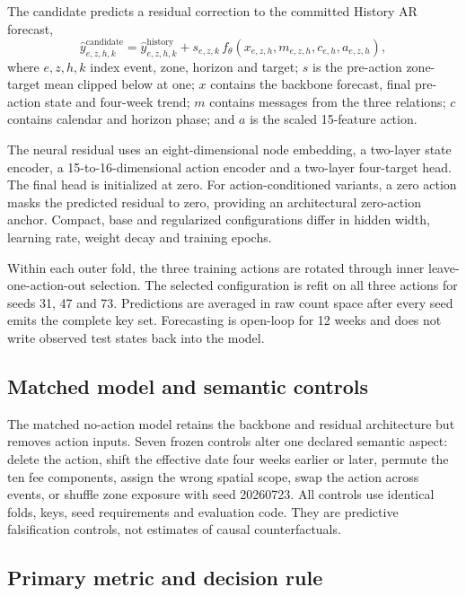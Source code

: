 \documentclass{nature}
\begin{document}
\begin{methods}
The candidate predicts a residual correction to the committed History AR forecast,
\begin{equation}
\widehat y^{\mathrm{candidate}}_{e,z,h,k}
=\widehat y^{\mathrm{history}}_{e,z,h,k}
+s_{e,z,k}\,f_{\theta}(x_{e,z,h},m_{e,z,h},c_{e,h},a_{e,z,h}),
\end{equation}
where $e,z,h,k$ index event, zone, horizon and target; $s$ is the pre-action zone-target mean clipped below at one; $x$ contains the backbone forecast, final pre-action state and four-week trend; $m$ contains messages from the three relations; $c$ contains calendar and horizon phase; and $a$ is the scaled 15-feature action.

The neural residual uses an eight-dimensional node embedding, a two-layer state encoder, a 15-to-16-dimensional action encoder and a two-layer four-target head. The final head is initialized at zero. For action-conditioned variants, a zero action masks the predicted residual to zero, providing an architectural zero-action anchor. Compact, base and regularized configurations differ in hidden width, learning rate, weight decay and training epochs.

Within each outer fold, the three training actions are rotated through inner leave-one-action-out selection. The selected configuration is refit on all three actions for seeds 31, 47 and 73. Predictions are averaged in raw count space after every seed emits the complete key set. Forecasting is open-loop for 12 weeks and does not write observed test states back into the model.

\subsection{Matched model and semantic controls}

The matched no-action model retains the backbone and residual architecture but removes action inputs. Seven frozen controls alter one declared semantic aspect: delete the action, shift the effective date four weeks earlier or later, permute the ten fee components, assign the wrong spatial scope, swap the action across events, or shuffle zone exposure with seed 20260723. All controls use identical folds, keys, seed requirements and evaluation code. They are predictive falsification controls, not estimates of causal counterfactuals.

\subsection{Primary metric and decision rule}


\end{methods}
\end{document}
